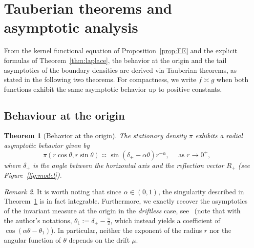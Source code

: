 \documentclass{article}
\theoremstyle{plain}
\newtheorem{theorem}{Theorem}[section]
\theoremstyle{definition}
\theoremstyle{remark}
\newtheorem{remark}[theorem]{Remark}
\begin{document}
\section{Tauberian theorems and asymptotic analysis}\label{sec:asymp}

From the kernel functional equation of Proposition~\ref{prop:FE} and the explicit formulas of Theorem~\ref{thm:laplace}, the behavior at the origin and the tail asymptotics of the boundary densities are derived via Tauberian theorems, as stated in the following two theorems. For compactness, we write $f\asymp g$ when both functions exhibit the same asymptotic behavior up to positive constants.

\subsection{Behaviour at the origin}

\begin{theorem}[Behavior at the origin]\label{thm:asymp} The stationary density $\pi$ exhibits a radial asymptotic behavior given by
$$\pi(r\cos\theta,r\sin \theta)\asymp \sin\left(\delta_+-\alpha\theta\right)r^{-\alpha},\quad \text{ as }r\to0^+,$$
where $\delta_+$ is the angle between the horizontal axis and the reflection vector $R_+$ (see Figure~\ref{fig:model}).
\end{theorem}

\begin{remark} It is worth noting that since $\alpha\in (0,1)$, the singularity described in Theorem~\ref{thm:asymp} is in fact integrable. Furthermore, we exactly recover the asymptotics of the invariant measure at the origin in the \textit{driftless} case, see~\cite{Williams_1985b} (note that with the author's notations, $\theta_1:=\delta_+-\frac\pi2$, which instead yields a coefficient of  $\cos(\alpha\theta-\theta_1)$). In particular, neither the exponent of the radius $r$ nor the angular function of $\theta$ depends on the drift $\mu$.
\end{remark}
\end{document}
